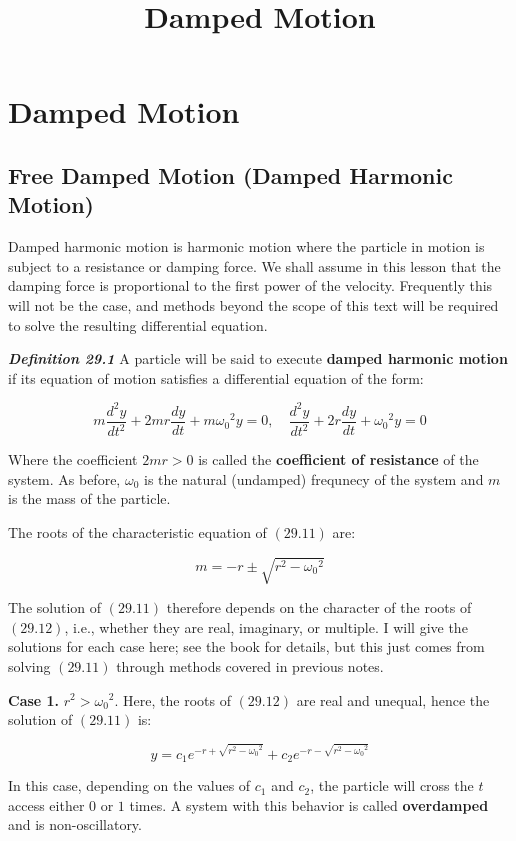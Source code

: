 \documentclass{article}
\title{Damped Motion}
\begin{document}
\section{Damped Motion}

\subsection{Free Damped Motion (Damped Harmonic Motion)}

Damped harmonic motion is harmonic motion where the particle in motion is subject to a resistance or damping force. We shall assume in this lesson that the damping force is proportional to the first power of the velocity. Frequently this will not be the case, and methods beyond the scope of this text will be required to solve the resulting differential equation.

\emph{\textbf{Definition 29.1}} A particle will be said to execute \textbf{damped harmonic motion} if its equation of motion satisfies a differential equation of the form:

\[ \tag{29.11} m\frac{d^2y}{dt^2} + 2mr \frac{dy}{dt} + m {\omega_0}^2 y = 0, \quad \frac{d^2y}{dt^2} + 2r \frac{dy}{dt} + {\omega_0}^2 y = 0 \]

Where the coefficient $2mr > 0$ is called the \textbf{coefficient of resistance} of the system. As before, $\omega_0$ is the natural (undamped) frequnecy of the system and $m$ is the mass of the particle.

The roots of the characteristic equation of $(29.11)$ are:

\[ \tag{29.12} m = -r \pm \sqrt{r^2 - {\omega_0}^2} \]

The solution of $(29.11)$ therefore depends on the character of the roots of $(29.12)$, i.e., whether they are real, imaginary, or multiple. I will give the solutions for each case here; see the book for details, but this just comes from solving $(29.11)$ through methods covered in previous notes.

\textbf{Case 1.} $r^2 > {\omega_0}^2$. Here, the roots of $(29.12)$ are real and unequal, hence the solution of $(29.11)$ is:

\[ \tag{29.13} y =  c_1 e^{-r + \sqrt{r^2 - {\omega_0}^2}} + c_2 e^{-r - \sqrt{r^2 - {\omega_0}^2}} \]

In this case, depending on the values of $c_1$ and $c_2$, the particle will cross the $t$ access either $0$ or $1$ times. A system with this behavior is called \textbf{overdamped} and is non-oscillatory.
\end{document}
